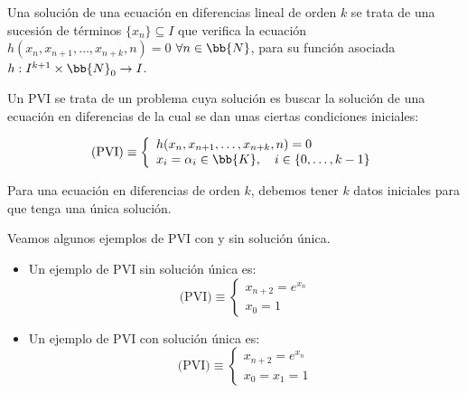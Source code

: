 \begin{definicion}[Solución]
    Una solución de una ecuación en diferencias lineal de orden $k$ se trata de una sucesión de términos $\{x_n\}\subseteq I$ que verifica la ecuación $h(x_n, x_{n+1}, \ldots, x_{n+k}, n) = 0$ $\forall n \in \bb{N}$, para su función asociada $h:I^{k+1}\times \bb{N}_0\to I$.
\end{definicion}

\begin{definicion}
    Un PVI se trata de un problema cuya solución es buscar la solución de una ecuación en diferencias de la cual se dan unas ciertas condiciones iniciales:

    \begin{equation*}
        \text{(PVI)}\equiv \left\{\begin{array}{l}
            h(x_n, x_{n+1}, \ldots, x_{n+k}, n) = 0 \\
            x_i = \alpha_i \in \bb{K},\quad i\in \{0, \ldots, k-1\}
        \end{array}\right.
    \end{equation*}

    Para una ecuación en diferencias de orden $k$, debemos tener $k$ datos iniciales para que tenga una única solución.
\end{definicion}

\begin{ejemplo} Veamos algunos ejemplos de PVI con y sin solución única.
    \begin{itemize}
        \item 
        Un ejemplo de PVI sin solución única es:
        \begin{equation*}
            \text{(PVI)}\equiv \left\{ \begin{array}{c}
                x_{n+2} = e^{x_n}\\
                x_0 = 1
            \end{array}\right.
        \end{equation*}

        \item Un ejemplo de PVI con solución única es:
        \begin{equation*}
            \text{(PVI)}\equiv \left\{ \begin{array}{c}
                x_{n+2} = e^{x_n}\\
                x_0 = x_1 = 1
            \end{array}\right.
        \end{equation*}
    \end{itemize}
\end{ejemplo}~\\

